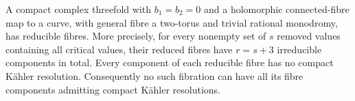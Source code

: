 \begin{proposition}\hypertarget{tag-01G8}{}\label{cdp:st:D.2.1}


A compact complex threefold with $b_1=b_2=0$ and a holomorphic
connected-fibre map to a curve, with general fibre a two-torus and
trivial rational monodromy, has reducible fibres. More precisely,
for every nonempty set of $s$ removed values containing all critical
values, their reduced fibres have $r=s+3$ irreducible components in
total. Every component of each reducible fibre has no compact
K\"ahler resolution. Consequently no such fibration can have all
its fibre components admitting compact K\"ahler resolutions.
\end{proposition}
